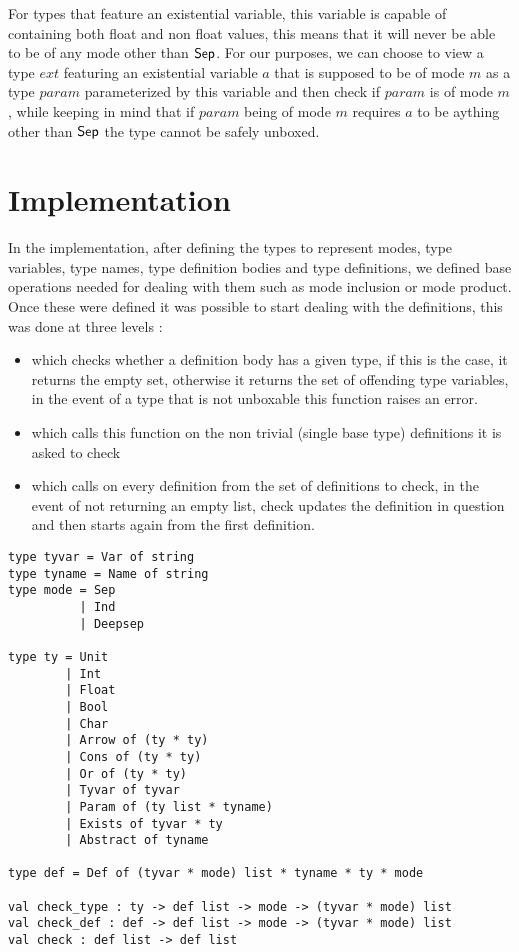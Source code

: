 \documentclass[a4]{article}
\begin{document}
For types that feature an existential variable, this variable is capable of containing both float and non float values, this means that it will never be able to be of any mode other than $\mathsf{Sep}$. For our purposes, we can choose to view a type $ext$ featuring an existential variable $a$ that is supposed to be of mode $m$ as a type $param$ parameterized by this variable and then check if $param$ is of mode $m$, while keeping in mind that if $param$ being of mode $m$ requires $a$ to be aything other than $\mathsf{Sep}$ the type cannot be safely unboxed.

\section{Implementation}

In the implementation, after defining the types to represent modes, type variables, type names, type definition bodies and type definitions, we defined base operations needed for dealing with them such as mode inclusion or mode product. Once these were defined it was possible to start dealing with the definitions, this was done at three levels :
\begin{itemize}
\item {} which checks whether a definition body has a given type, if this is the case, it returns the empty set, otherwise it returns the set of offending type variables, in the event of a type that is not unboxable this function raises an error.
\item {} which calls this function on the non trivial (single base type) definitions it is asked to check
\item {} which calls  on every definition from the set of definitions to check, in the event of  not returning an empty list, check updates the definition in question and then starts again from the first definition.
\end{itemize}

\begin{lstlisting}
type tyvar = Var of string
type tyname = Name of string
type mode = Sep
          | Ind
          | Deepsep

type ty = Unit
        | Int
        | Float
        | Bool
        | Char
        | Arrow of (ty * ty)
        | Cons of (ty * ty)
        | Or of (ty * ty)
        | Tyvar of tyvar
        | Param of (ty list * tyname)
        | Exists of tyvar * ty
        | Abstract of tyname

type def = Def of (tyvar * mode) list * tyname * ty * mode

val check_type : ty -> def list -> mode -> (tyvar * mode) list
val check_def : def -> def list -> mode -> (tyvar * mode) list
val check : def list -> def list
\end{lstlisting}
\end{document}

